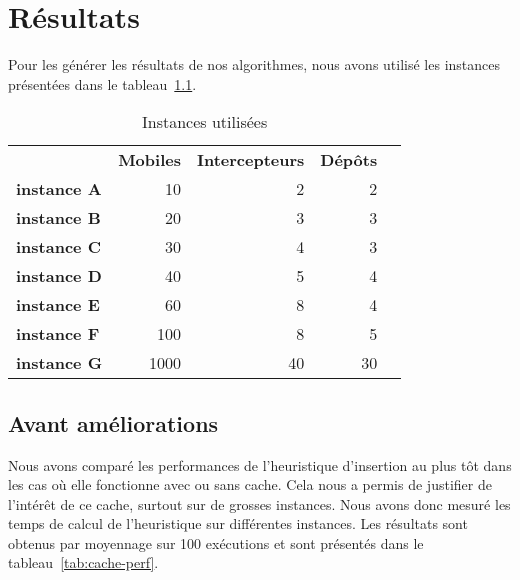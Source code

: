 \chapter{Résultats}

	Pour les générer les résultats de nos algorithmes, nous avons utilisé les instances présentées dans le tableau~\ref{tab:instances}.
	
	\begin{table}[h!]
		\centering
		\begin{tabular}{l|r|r|r|l}
		\cline{2-4}
                                                                     & \multicolumn{1}{c|}{\textbf{Mobiles}} & \multicolumn{1}{c|}{\textbf{Intercepteurs}} & \multicolumn{1}{c|}{\textbf{Dépôts}} &  \\ \cline{1-4}
            \multicolumn{1}{|l|}{\textbf{instance A}}   & 10                               & 2                               & 2                               &  \\ \cline{1-4}
            \multicolumn{1}{|l|}{\textbf{instance B}}   & 20                               & 3                               & 3                               &  \\ \cline{1-4}
            \multicolumn{1}{|l|}{\textbf{instance C}}   & 30                               & 4                               & 3                               &  \\ \cline{1-4}
            \multicolumn{1}{|l|}{\textbf{instance D}}   & 40                               & 5                               & 4                               &  \\ \cline{1-4}
            \multicolumn{1}{|l|}{\textbf{instance E}}   & 60                               & 8                               & 4                               &  \\ \cline{1-4}
            \multicolumn{1}{|l|}{\textbf{instance F}}  & 100                                & 8                               & 5                               &  \\ \cline{1-4}
            \multicolumn{1}{|l|}{\textbf{instance G}} & 1000                                & 40                           & 30                               &  \\ \cline{1-4}
            \end{tabular}
            \caption{Instances utilisées}
            \label{tab:instances}
        \end{table}
		

    \section{Avant améliorations}
        Nous avons comparé les performances de l'heuristique d'insertion au plus tôt dans les cas où elle fonctionne avec ou sans cache. Cela nous a permis de justifier de l'intérêt de ce cache, surtout sur de grosses instances. Nous avons donc mesuré les temps de calcul de l'heuristique sur différentes instances. Les résultats sont obtenus par moyennage sur 100 exécutions et sont présentés dans le tableau~\ref{tab:cache-perf}.

